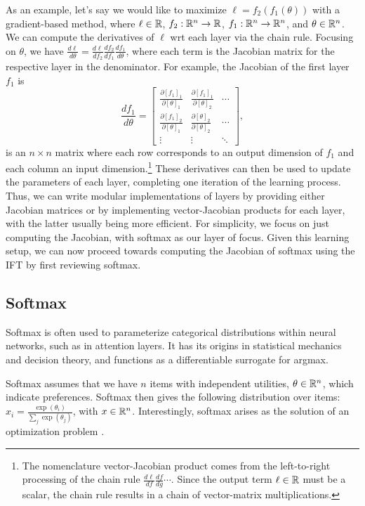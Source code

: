 \documentclass[11pt]{article}
\begin{document}
As an example, let's say we would like to maximize $\ell = f_2(f_1(\theta))$ with a gradient-based method,
where $\ell\in\mathbb{R}$, $f_2:\mathbb{R}^n\to\mathbb{R}$, $f_1:\mathbb{R}^n\to\mathbb{R}^n$, and $\theta\in\mathbb{R}^n$.
We can compute the derivatives of $\ell$ wrt each layer via the chain rule.
Focusing on $\theta$,
we have $\frac{d\ell}{d\theta} = \frac{d\ell}{df_2}\frac{df_2}{df_1}\frac{df_1}{d\theta}$,
where each term is the Jacobian matrix for the respective layer in the denominator.
For example, the Jacobian of the first layer $f_1$ is
$$\frac{df_1}{d\theta} = \begin{bmatrix}
\frac{\partial [f_1]_1}{\partial [\theta]_1} & 
    \frac{\partial [f_1]_1}{\partial [\theta]_2} &
    \cdots\\
\frac{\partial [f_1]_2}{\partial [\theta]_1} & 
    \frac{\partial [\theta]_2}{\partial [\theta]_2} &
    \cdots \\
\vdots & \vdots & \ddots
\end{bmatrix},
$$
is an $n\times n$ matrix where each row corresponds to an output dimension of $f_1$
and each column an input dimension.\footnote{
The nomenclature vector-Jacobian product
comes from the left-to-right processing of the chain rule $\frac{d\ell}{df}\frac{df}{dg}\cdots$.
Since the output term $\ell\in\mathbb{R}$ must be a scalar,
the chain rule results in a chain of vector-matrix multiplications.
}
These derivatives can then be used to update the parameters of each layer,
completing one iteration of the learning process.
Thus, we can write modular implementations of layers by providing either Jacobian matrices
or by implementing vector-Jacobian products for each layer, with the latter usually
being more efficient.
For simplicity, we focus on just computing the Jacobian, with softmax as our
layer of focus.
Given this learning setup, we can now proceed towards computing the Jacobian of softmax
using the IFT by first reviewing softmax.

\subsection{Softmax}
Softmax is often used to parameterize categorical distributions within neural networks,
such as in attention layers.
It has its origins in statistical mechanics and decision theory, and functions
as a differentiable surrogate for argmax.

Softmax assumes that we have $n$ items with independent utilities, $\theta \in \mathbb{R}^n$,
which indicate preferences.
Softmax then gives the following distribution over items:
$x_i = \frac{\exp(\theta_i)}{\sum_j \exp(\theta_j)}$, with $x\in\mathbb{R}^n$.
Interestingly, softmax arises as the solution of an optimization problem
\citep{gao2018properties}.
\end{document}
